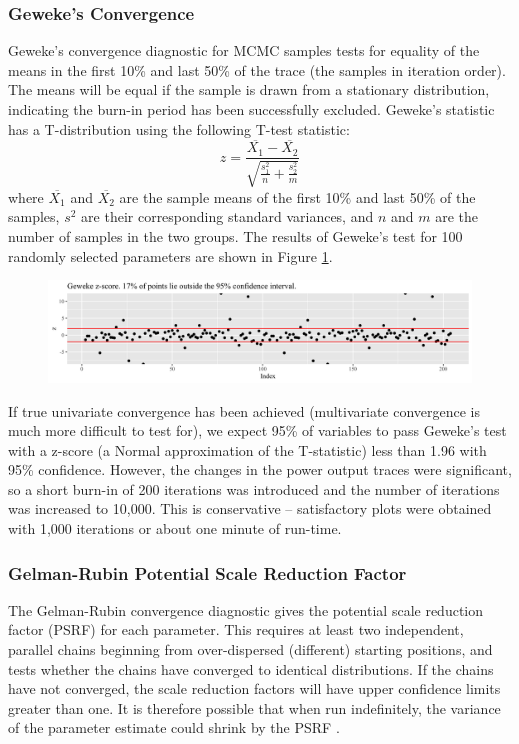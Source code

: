 \documentclass[a4paper, 12pt]{article}
\begin{document}
\subsubsection{Geweke's Convergence}
Geweke's convergence diagnostic for MCMC samples tests for equality of the means in the first 10\% and last 50\% of the trace (the samples in iteration order). The means will be equal if the sample is drawn from a stationary distribution, indicating the burn-in period has been successfully excluded. Geweke's statistic has a T-distribution using the following T-test statistic:
\begin{equation}
z=\frac{\overline{X_1}-\overline{X_2}}{\sqrt{\frac{s_1^2}{n} + \frac{s_2^2}{m}}}
\end{equation}
where $\overline{X_1}$ and $\overline{X_2}$ are the sample means of the first 10\% and last 50\% of the samples, $s^2$ are their corresponding standard variances, and $n$ and $m$ are the number of samples in the two groups. The results of Geweke's test for 100 randomly selected parameters are shown in Figure \ref{fig:geweke}.

\begin{figure}
  \centering
  \includegraphics[width=\linewidth]{media/geweke}
  \label{fig:geweke}
\end{figure}

If true univariate convergence has been achieved (multivariate convergence is much more difficult to test for), we expect 95\% of variables to pass Geweke's test with a z-score (a Normal approximation of the T-statistic) less than 1.96 with 95\% confidence. However, the changes in the power output traces were significant, so a short burn-in of 200 iterations was introduced and the number of iterations was increased to 10,000. This is conservative -- satisfactory plots were obtained with 1,000 iterations or about one minute of run-time.

\subsubsection{Gelman-Rubin Potential Scale Reduction Factor}
The Gelman-Rubin convergence diagnostic gives the potential scale reduction factor (PSRF) for each parameter. This requires at least two independent, parallel chains beginning from over-dispersed (different) starting positions, and tests whether the chains have converged to identical distributions. If the chains have not converged, the scale reduction factors will have upper confidence limits greater than one. It is therefore possible that when run indefinitely, the variance of the parameter estimate could shrink by the PSRF \cite{Gelman:1992}.
\end{document}
